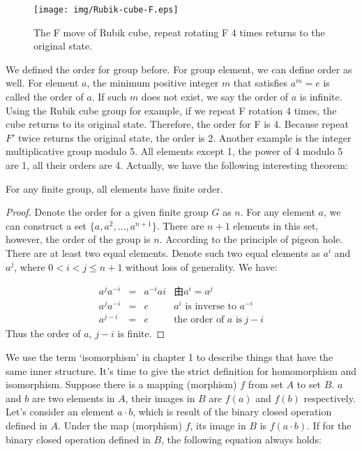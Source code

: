 \documentclass{article}
\begin{document}
\begin{figure}[htbp]
 \centering
 \texttt{[image: img/Rubik-cube-F.eps]}
 \caption{The F move of Rubik cube, repeat rotating F 4 times returns to the original state.}
 \label{fig:Rubik-cube-F}
\end{figure}

We defined the order for group before. For group element, we can define order as well. For element $a$, the minimum positive integer $m$ that satisfies $a^m = e$ is called the order of $a$. If such $m$ does not exist, we say the order of $a$ is infinite. Using the Rubik cube group for example, if we repeat F rotation 4 times, the cube returns to its original state. Therefore, the order for F is 4. Because repeat $F'$ twice returns the original state, the order is 2. Another example is the integer multiplicative group modulo 5. All elements except 1, the power of 4 modulo 5 are 1, all their orders are 4. Actually, we have the following interesting theorem:

\begin{theorem}
For any finite group, all elements have finite order.
\end{theorem}

\begin{proof}
Denote the order for a given finite group $G$ as $n$. For any element $a$, we can construct a set $\{a, a^2, ..., a^{n+1}\}$. There are $n + 1$ elements in this set, however, the order of the group is $n$. According to the principle of pigeon hole. There are at least two equal elements. Denote such two equal elements as $a^i$ and $a^j$, where $0 < i < j \leq n + 1$ without loss of generality. We have:

\[
\begin{array}{rcll}
a^ja^{-i} & = & a^{-i}a{i} & \text{由} a^i = a^j \\
a^ja^{-i} & = & e & \text{$a^i$ is inverse to $a^{-i}$} \\
a^{j-i} & = & e & \text{the order of $a$ is}\ j - i
\end{array}
\]
Thus the order of $a$, $j - i$ is finite.
\end{proof}

We use the term `isomorphism' in chapter 1 to describe things that have the same inner structure. It's time to give the strict definition for homomorphism and isomorphism. Suppose there is a mapping (morphism) $f$ from set $A$ to set $B$. $a$ and $b$ are two elements in $A$, their images in $B$ are $f(a)$ and $f(b)$ respectively. Let's consider an element $a \cdot b$, which is result of the binary closed operation defined in $A$. Under the map (morphism) $f$, its image in $B$ is $f(a \cdot b)$. If for the binary closed operation defined in $B$, the following equation always holds:
\end{document}
